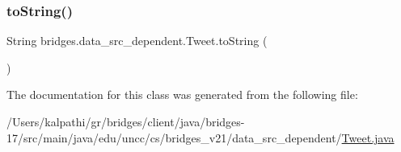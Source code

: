 \mbox{\label{classbridges_1_1data__src__dependent_1_1_tweet_adfba67504a7463a7f16aff46d2bb893f}} 
\subsubsection{\texorpdfstring{to\+String()}{toString()}}
{\footnotesize\ttfamily String bridges.\+data\+\_\+src\+\_\+dependent.\+Tweet.\+to\+String (\begin{DoxyParamCaption}{ }\end{DoxyParamCaption})}



The documentation for this class was generated from the following file\+:\begin{DoxyCompactItemize}
\item 
/\+Users/kalpathi/gr/bridges/client/java/bridges-\/17/src/main/java/edu/uncc/cs/bridges\+\_\+v21/data\+\_\+src\+\_\+dependent/\mbox{\hyperlink{_tweet_8java}{Tweet.\+java}}\end{DoxyCompactItemize}
